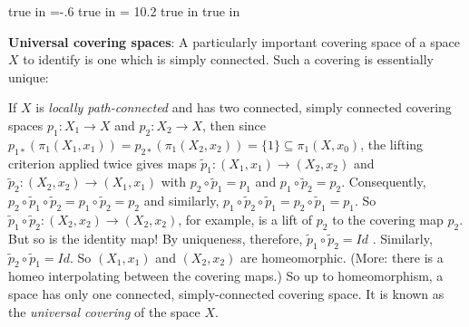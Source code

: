 
\overfullrule=0pt
\parindent=0pt

\nopagenumbers




 true in
\hoffset=-.6 true in
\hsize = 10.2 true in
 true in



\def\cltr{\Red}		  %

\loadmsbm



\def\ctln{\centerline}
\def\u{\underbar}
\def\ssk{\smallskip}
\def\msk{\medskip}
\def\bsk{\bigskip}
\def\hsk{\hskip.1in}
\def\hhsk{\hskip.2in}
\def\dsl{\displaystyle}
\def\hskp{\hskip1.5in}

\def\lra{$\Leftrightarrow$ }
\def\ra{\rightarrow}
\def\mpto{\logmapsto}
\def\pu{\pi_1}
\def\mpu{$\pi_1$}
\def\sig{\Sigma}
\def\msig{$\Sigma$}
\def\ep{\epsilon}
\def\sset{\subseteq}
\def\del{\partial}
\def\inv{^{-1}}
\def\wtl{\widetilde}
\def\del{\partial}
\def\delp{\partial^\prime}
\def\delpp{\partial^{\prime\prime}}
\def\sgn{{\roman{sgn}}}
\def\wtih{\widetilde{H}}
\def\bbz{{\Bbb Z}}
\def\bbr{{\Bbb R}}
\def\rtar{$\Rightarrow$}

\def\cltr{\Red}		  %
\def\cltb{\Blue}		  %
\def\cltg{\PineGreen}	  %


{\bf Universal covering spaces}: A particularly
important covering space  of a space $X$ to identify 
is one which is simply connected. Such a covering 
is essentially unique:

\msk

If $X$ is {\it locally path-connected} and has two connected, simply connected
covering spaces $p_1:X_1\ra X$ and $p_2:X_2\ra X$, then since 
$p_{1*}(\pu(X_1,x_1)) = p_{2*}(\pu(X_2,x_2))=\{1\}\sset \pu(X,x_0)$,
the lifting criterion applied twice
gives maps $\wtl{p}_1:(X_1,x_1)\ra (X_2,x_2)$ and 
$\wtl{p}_2:(X_2,x_2)\ra (X_1,x_1)$ with $p_2\circ\wtl{p}_1=p_1$
and $p_1\circ\wtl{p}_2=p_2$. Consequently, 
$p_2\circ\wtl{p}_1\circ \wtl{p}_2 = p_1\circ\wtl{p}_2=p_2$
and similarly, 
$p_1\circ\wtl{p}_2\circ \wtl{p}_1 =p_2\circ\wtl{p}_1=p_1$.
So $\wtl{p}_1\circ \wtl{p}_2:(X_2,x_2)\ra (X_2,x_2)$, for example,
is a lift of $p_2$ to the covering map $p_2$. But so is the identity map! By
uniqueness, therefore, $\wtl{p}_1\circ \wtl{p}_2=Id$ . Similarly,
$\wtl{p}_2\circ \wtl{p}_1=Id$. So $(X_1,x_1)$ and $(X_2,x_2)$ 
are homeomorphic. (More: there is a homeo interpolating between the
covering maps.) So up to homeomorphism, a space has
only one connected, simply-connected covering space. It is known
as the {\it universal covering} of the space $X$. 

